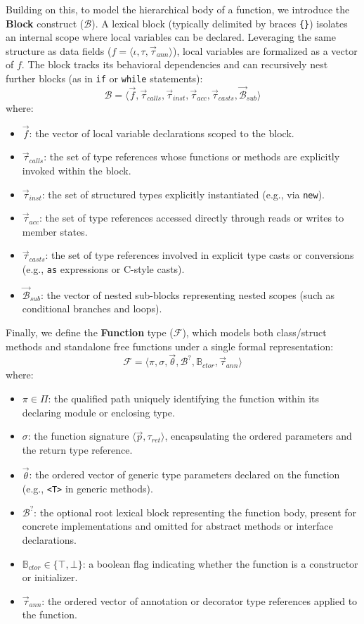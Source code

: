 Building on this, to model the hierarchical body of a function, we
introduce the \textbf{Block} construct ($\mathcal{B}$). A lexical
block (typically delimited by braces \texttt{\{\}}) isolates an
internal scope where local variables can be declared. Leveraging the
same structure as data fields ($f = \langle \iota, \tau,
\vec{\tau}_{ann} \rangle$),
local variables are formalized as a vector of $f$. The block
tracks its behavioral dependencies and can recursively nest further
blocks (as in \texttt{if} or \texttt{while} statements):
$$\mathcal{B} = \langle \vec{f}, \vec{\tau}_{calls},
\vec{\tau}_{inst}, \vec{\tau}_{acc}, \vec{\tau}_{casts},
\vec{\mathcal{B}}_{sub} \rangle$$
where:
\begin{itemize}
  \item $\vec{f}$: the vector of local variable declarations scoped
    to the block.
  \item $\vec{\tau}_{calls}$: the set of type references whose
    functions or methods
    are explicitly invoked within the block.
  \item $\vec{\tau}_{inst}$: the set of structured types explicitly instantiated
    (e.g., via \texttt{new}).
  \item $\vec{\tau}_{acc}$: the set of type references accessed directly through
    reads or writes to member states.
  \item $\vec{\tau}_{casts}$: the set of type references involved in
    explicit type
    casts or conversions (e.g., \texttt{as} expressions or C-style casts).
  \item $\vec{\mathcal{B}}_{sub}$: the vector of nested sub-blocks representing
    nested scopes (such as conditional branches and loops).
\end{itemize}

Finally, we define the \textbf{Function} type
($\mathcal{F}$), which models both class/struct methods and standalone free
functions under a single formal representation:
$$\mathcal{F} = \langle \pi, \sigma, \vec{\theta}, \mathcal{B}^?,
\mathbb{B}_{ctor}, \vec{\tau}_{ann} \rangle$$
where:
\begin{itemize}
  \item $\pi \in \Pi$: the qualified path uniquely identifying the
    function within
    its declaring module or enclosing type.
  \item $\sigma$: the function signature $\langle \vec{p}, \tau_{ret} \rangle$,
    encapsulating the ordered parameters and the return type reference.
  \item $\vec{\theta}$: the ordered vector of generic type parameters
    declared on
    the function (e.g., \texttt{<T>} in generic methods).
  \item $\mathcal{B}^?$: the optional root lexical block representing
    the function
    body, present for concrete implementations and omitted for abstract methods
    or interface declarations.
  \item $\mathbb{B}_{ctor} \in \{ \top, \bot \}$: a boolean flag
    indicating whether
    the function is a constructor or initializer.
  \item $\vec{\tau}_{ann}$: the ordered vector of annotation or decorator type
    references applied to the function.
\end{itemize}

